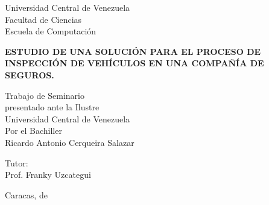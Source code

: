 \begin{center}
	Universidad Central de Venezuela\\
	Facultad de Ciencias\\
	Escuela de Computación\\
	
\end{center}

\vspace{2.5cm}
\begin{center}
	\large{\textbf{ ESTUDIO DE UNA SOLUCIÓN PARA EL PROCESO DE INSPECCIÓN DE VEHÍCULOS EN UNA COMPAÑÍA DE SEGUROS. }}
\end{center}

\vspace{6.0cm}
\begin{center}
	Trabajo de Seminario \\
	presentado ante la Ilustre\\
	Universidad Central de Venezuela\\
	Por el Bachiller\\
	Ricardo Antonio Cerqueira Salazar\\
\end{center}

\begin{center}
	Tutor:\\ Prof. Franky Uzcategui\\
\end{center}

\vspace{1.0cm}
\begin{center}
	Caracas, \monthname[\month] de \the\year
\end{center}